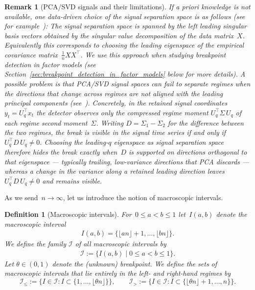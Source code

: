 \documentclass[10pt, letterpaper]{amsart}
\newtheorem{remark}[theorem]{Remark}
\newtheorem{defn}[theorem]{Definition}
\begin{document}
\begin{remark}[PCA/SVD signals and their limitations]\label{rem:data_driven_signal_space}
     If a priori knowledge is not available, one data-driven choice of the signal separation space is as follows (see for example~\cite{Bai2003,BaiHanShi2020,DuanBaiHan2023}): The signal separation space is spanned by the left leading singular basis vectors obtained by the singular value decomposition of the data matrix~$X$. Equivalently this corresponds to choosing the leading eigenspace of the empirical covariance matrix~$\frac{1}{n} X X^{\top}$. We use this approach when studying breakpoint detection in factor models (see Section~\ref{sec:breakpoint_detection_in_factor_models} below for more details).    
     A possible problem is that PCA/SVD signal spaces can fail to separate regimes when the directions that change
across regimes are \emph{not} aligned with the leading principal components (see~\cite{AueRiceSonmez2018}).
 Concretely, in the retained signal coordinates $y_t=U_q^{\top}x_t$ the detector observes only the compressed regime moment $U_q^{\top}\Sigma\,U_q$ of each regime second moment~$\Sigma$. Writing $D=\Sigma_1-\Sigma_2$ for the difference between the two regimes, the break is visible in the signal time series if and only if $U_q^{\top} D\, U_q\neq 0$. Choosing the leading-$q$ eigenspace as signal separation space therefore hides the break exactly when~$D$ is supported on directions orthogonal to that eigenspace --- typically trailing, low-variance directions that PCA discards --- whereas a change in the variance along a \emph{retained} leading direction leaves $U_q^{\top} D\, U_q\neq 0$ and remains visible.

\end{remark}

 
As we send~$n \to \infty$, let us introduce the notion of macroscopic intervals.
\begin{defn}[Macroscopic intervals]
For~$0 \leq a < b \leq 1$ let~$I(a,b)$ denote the macroscopic interval
\begin{align}
    I(a,b) = \{\lfloor a n \rfloor+1 , \ldots , \lfloor b n \rfloor \}.
\end{align}
    We define the family $\mathcal{I}$ of all macroscopic intervals by
\begin{align}
    \mathcal{I}
    := \Big\{ I(a,b)
          \;\Big|\; 0 \leq a < b \leq 1 \Big\}.
\end{align}
Let $\theta\in(0,1)$ denote the (unknown) breakpoint. We define the sets of macroscopic
intervals that lie entirely in the left- and right-hand regimes by
\[
    \mathcal{I}_{\leq}
    := \bigl\{ I\in\mathcal{I} : I \subset \{1,\dots,\lfloor \theta n \rfloor\} \bigr\},
    \qquad
    \mathcal{I}_{>}
    := \bigl\{ I\in\mathcal{I} : I \subset \{\lfloor \theta n \rfloor+1,\dots,n\} \bigr\}.
\]
\end{defn}
\end{document}
